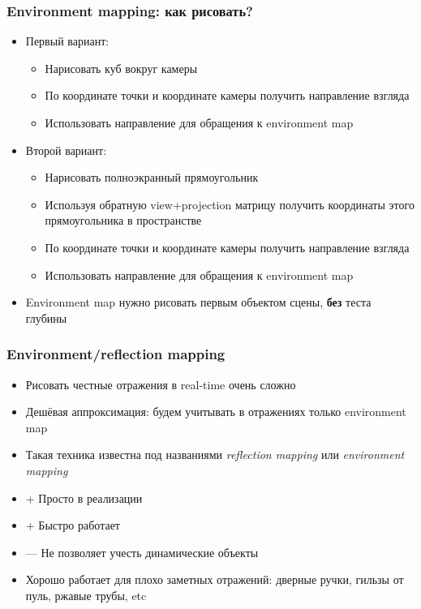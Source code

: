 \documentclass[10pt]{beamer}
\begin{document}
\begin{frame}[fragile]
\frametitle{Environment mapping: как рисовать?}
\begin{itemize}
\item Первый вариант:
\pause
\begin{itemize}
\item Нарисовать куб вокруг камеры
\pause
\item По координате точки и координате камеры получить направление взгляда
\pause
\item Использовать направление для обращения к environment map
\end{itemize}
\pause
\item Второй вариант:
\begin{itemize}
\item Нарисовать полноэкранный прямоугольник
\pause
\item Используя обратную view+projection матрицу получить координаты этого прямоугольника в пространстве
\pause
\item По координате точки и координате камеры получить направление взгляда
\pause
\item Использовать направление для обращения к environment map
\end{itemize}
\pause
\item Environment map нужно рисовать первым объектом сцены, \textbf{без} теста глубины
\end{itemize}
\end{frame}

\begin{frame}[fragile]
\frametitle{Environment/reflection mapping}
\begin{itemize}
\item Рисовать честные отражения в real-time очень сложно
\pause
\item Дешёвая аппроксимация: будем учитывать в отражениях только environment map
\pause
\item Такая техника известна под названиями \textit{reflection mapping} или \textit{environment mapping}
\pause
\item {\color{green}+} Просто в реализации
\item {\color{green}+} Быстро работает
\item {\color{red}—} Не позволяет учесть динамические объекты
\pause
\item Хорошо работает для плохо заметных отражений: дверные ручки, гильзы от пуль, ржавые трубы, etc
\end{itemize}
\end{frame}
\end{document}
